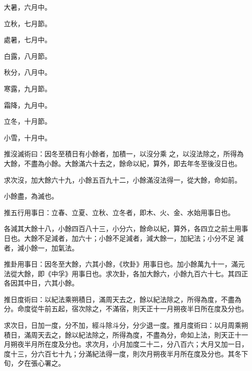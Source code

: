 \begin{pinyinscope}
大暑，六月中。


立秋，七月節。


處暑，七月中。


白露，八月節。


秋分，八月中。


寒露，九月節。


霜降，九月中。


立冬，十月節。


小雪，十月中。



 推沒滅術曰：因冬至積日有小餘者，加積一，以沒分乘
 之，以沒法除之，所得為大餘，不盡為小餘。大餘滿六十去之，餘命以紀，算外，即去年冬至後沒日也。



 求次沒，加大餘六十九，小餘五百九十二，小餘滿沒法得一，從大餘，命如前。



 小餘盡，為滅也。



 推五行用事日：立春、立夏、立秋、立冬者，即木、火、金、水始用事日也。



 各減其大餘十八，小餘四百八十三，小分六，餘命以紀，算外，各四立之前土用事日也。大餘不足減者，加六十；小餘不足減者，減大餘一，加紀法；小分不足
 減者，減小餘一，加氣法。



 推卦用事日：因冬至大餘，六其小餘，《坎卦》用事日也。加小餘萬九十一，滿元法從大餘，即《中孚》用事日也。求次卦，各加大餘六，小餘九百六十七。其四正各因其中日，六其小餘。



 推日度術曰：以紀法乘朔積日，滿周天去之，餘以紀法除之，所得為度，不盡為分。命度從牛前五起，宿次除之，不滿宿，則天正十一月朔夜半日所在度及分也。



 求次日，日加一度，分不加，經斗除斗分，分少退一度。推月度術曰：以月周乘朔積日，滿周天去之，餘以紀法除之，所得為度，不盡為分，命如上法，則天正十一月朔夜半月所在度及分也。求次月，小月加度二十二，分八百六；大月又加一日，度十三，分六百七十九；分滿紀法得一度，則次月朔夜半月所在度及分也。其冬下旬，夕在張心署之。




\end{pinyinscope}
